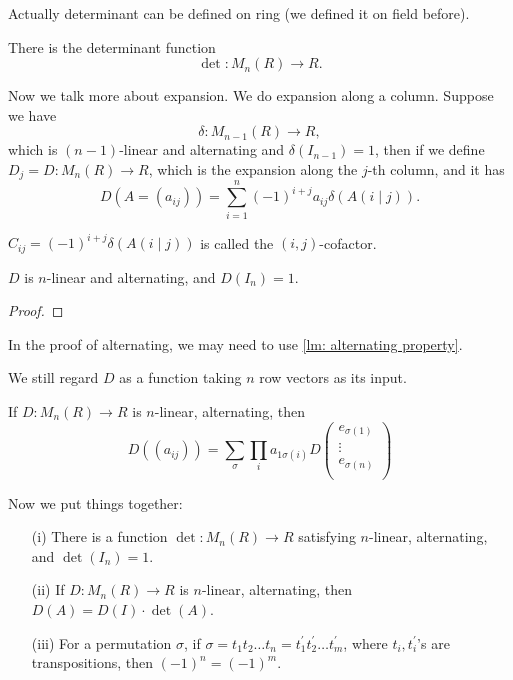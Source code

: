 Actually determinant can be defined on ring (we defined it on field before). 
\begin{theorem}
    There is the determinant function 
    \[
        \det : M_n(R) \to R.
    \]
\end{theorem}

Now we talk more about expansion. We do expansion along a column. 
Suppose we have 
\[
    \delta : M_{n-1}(R) \to R,
\]which is \((n-1)\)-linear and alternating and \(\delta (I_{n-1}) = 1\), then if we define \(D_j = D: M_n(R) \to R\), which is the expansion along the \(j\)-th column, and it has 
\[
    D(A = (a_{ij})) = \sum_{i=1}^n (-1)^{i+j} a_{ij} \delta \left( A(i \mid j) \right).  
\] 

\begin{note}
    \(C_{ij} = (-1)^{i+j} \delta \left( A(i \mid j) \right)  \) is called the \((i, j)\)-cofactor. 
\end{note}

\begin{theorem}
    \(D\) is \(n\)-linear and alternating, and \(D(I_n) = 1\).   
\end{theorem}
\begin{proof}
\end{proof}
\begin{note}
    In the proof of alternating, we may need to use \autoref{lm: alternating property}. 
\end{note}
\begin{note}
    We still regard \(D\) as a function taking \(n\) row vectors as its input.
\end{note}

\begin{prev}
    If \(D: M_n(R) \to R\) is \(n\)-linear, alternating, then 
    \[
        D \left( (a_{ij}) \right) = \sum_{\sigma } \prod _{i} a_{1 \sigma (i)} D \begin{pmatrix}
             e_{\sigma (1)} \\
             \vdots \\
             e_{\sigma (n)} \\
        \end{pmatrix}  
    \]  
\end{prev}

Now we put things together: 
\begin{theorem}
    \vphantom{text}
    \begin{itemize}
        \item [(i)] There is a function \(\det : M_n(R) \to R\) satisfying \(n\)-linear, alternating, and \(\det (I_n) = 1\). 
        \item [(ii)] If \(D: M_n(R) \to R\) is \(n\)-linear, alternating, then \(D(A) = D(I) \cdot \det (A)\).
        \item [(iii)] For a permutation \(\sigma \), if \(\sigma = t_1 t_2\dots t_n = t_1^{\prime} t_2^{\prime} \dots t_m^{\prime} \), where \(t_i, t_i^{\prime} \)'s are transpositions, then \((-1)^n = (-1)^m\).        
    \end{itemize}
\end{theorem}

